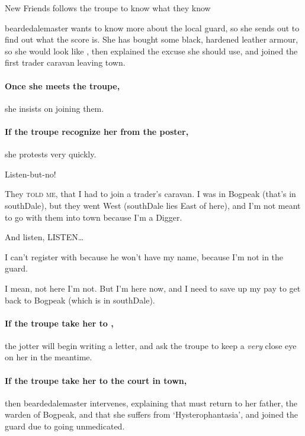 {New Friends}%
{ follows the troupe to know what they know}%

\Gls{beardedalemaster} wants to know more about the local \gls{guard}, so she sends  out to find out what the score is.
She has bought  some black, hardened leather armour, so she would look like , then explained the excuse she should use, and  joined the first trader caravan leaving \gls{town}.

\paragraph{Once she meets the troupe,}
she insists on joining them.

\paragraph{If the troupe recognize her from the poster,}
she protests very quickly.

\begin{speechtext}
  Listen-but-no!
  
  They {\scshape told me}, that I had to join a trader's caravan.
  I was in Bogpeak (that's in \gls{southDale}), but they went West (\gls{southDale} lies East of here), and I'm not meant to go with them into \gls{town} because I'm a Digger.
  
  And listen, LISTEN\ldots

  I can't register with  because he won't have my name, because I'm not in the \gls{guard}.

  I mean, not here I'm not.
  But I'm here now, and I need to save up my pay to get back to Bogpeak (which is in \gls{southDale}).
\end{speechtext}

\paragraph{If the troupe take her to ,}
the \gls{jotter} will begin writing a letter, and ask the troupe to keep a \textit{very} close eye on her in the meantime.

\paragraph{If the troupe take her to the \gls{court} in \gls{town},}
then \gls{beardedalemaster} intervenes, explaining that  must return to her father, the \gls{warden} of Bogpeak, and that she suffers from `Hysterophantasia', and joined the \gls{guard} due to going unmedicated.

